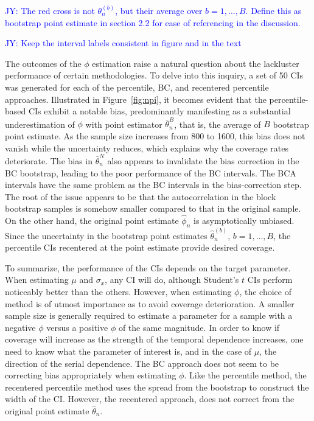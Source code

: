 \documentclass[12pt, letterpaper, titlepage]{article}
\newcommand{\jy}[1]{\textcolor{blue}{JY: #1}}
\begin{document}
\jy{The red cross is not $\theta_n^{(b)}$, but their average over
  $b = 1,  \ldots, B$. Define this as bootstrap point estimate in section 2.2
  for ease of referencing in the discussion.}

\jy{Keep the interval labels consistent in figure and in the text}

The outcomes of the $\phi$ estimation raise a natural question about the
lackluster performance of certain methodologies. To delve into this inquiry, a
set of 50 CIs was generated for each of the percentile, BC, and recentered
percentile  approaches. Illustrated in Figure~\ref{fig:npi}, it becomes
evident that the percentile-based CIs exhibit a notable bias, predominantly
manifesting as a substantial underestimation of $\phi$ with point estimator
$\bar\theta_n^B$, that is, the average of $B$ bootstrap point estimate. As the
sample size increases from 800 to 1600, this bias does not vanish while the
uncertainty reduces, which explains why the coverage rates deteriorate. The bias
in $\bar\theta_n^N$ also appears to invalidate the bias correction in the BC
bootstrap, leading to the poor performance of the BC intervals. The BCA
intervals have the same problem as the BC intervals in the bias-correction step.
The root of the issue appears to be that the autocorrelation in the block
bootstrap samples is somehow smaller compared to that in the original sample.
On the other hand, the original point estimate $\hat\phi_n$ is asymptotically
unbiased. Since the uncertainty in the bootstrap point estimates
$\hat\theta_n^{(b)}$, $b = 1, \ldots, B$, the percentile CIs recentered at the
point estimate provide desired coverage.


To summarize, the performance of the CIs depends on the target parameter. When
estimating $\mu$ and $\sigma_x$, any CI will do, although Student's $t$ CIs
perform noticeably better than the others. However, when estimating $\phi$,
the choice of method is of utmost importance as to avoid coverage
deterioration. A smaller sample size is generally required to estimate a
parameter for a sample with a negative $\phi$ versus a positive $\phi$ of the
same magnitude. In order to know if coverage will increase as the strength of
the temporal dependence increases, one need to know what the parameter of
interest is, and in the case of $\mu$, the direction of the serial dependence. The
BC approach does not seem to be correcting bias appropriately when estimating
$\phi$. Like the percentile method, the recentered percentile method uses the spread from the 
bootstrap to construct the width of the CI. However, the recentered approach, does
not correct from the original point estimate $\hat\theta_n$.
\end{document}
